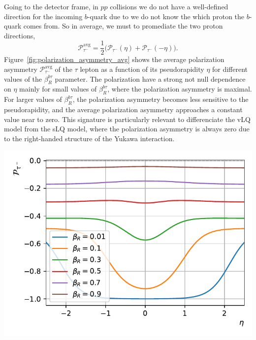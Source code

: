 Going to the detector frame, in $pp$ collisions we do not have a well-defined direction for the incoming $b$-quark due to we do not know the which proton the $b$-quark comes from. So in average, we must to promediate the two proton directions, 
\begin{equation}
    \mathcal{P}_{\tau^-}^{\text{avg}} = \frac{1}{2}\big(\mathcal{P}_{\tau^-}(\eta) + \mathcal{P}_{\tau^-}(-\eta)\big).
\end{equation}
Figure~\ref{fig:polarization_asymmetry_avg} shows the average polarization asymmetry $\mathcal{P}_{\tau^-}^{\text{avg}}$ of the $\tau$ lepton as a function of its pseudorapidity $\eta$ for different values of the $\beta_R^{b\tau}$ parameter. The polarization have a strong not null dependence on $\eta$ mainly for small values of $\beta_R^{b\tau}$, where the polarization asymmetry is maximal. For larger values of $\beta_R^{b\tau}$, the polarization asymmetry becomes less sensitive to the pseudorapidity, and the average polarization asymmetry approaches a constant value near to zero. This signature is particularly relevant to differenciate the vLQ model from the sLQ model, where the polarization asymmetry is always zero due to the right-handed structure of the Yukawa interaction.

\begin{center}
    \includegraphics[width=.9\linewidth]{Images/P_vlQ_tau_minus_vs_eta_avg.pdf}
    \label{fig:polarization_asymmetry_avg}
\end{center}

